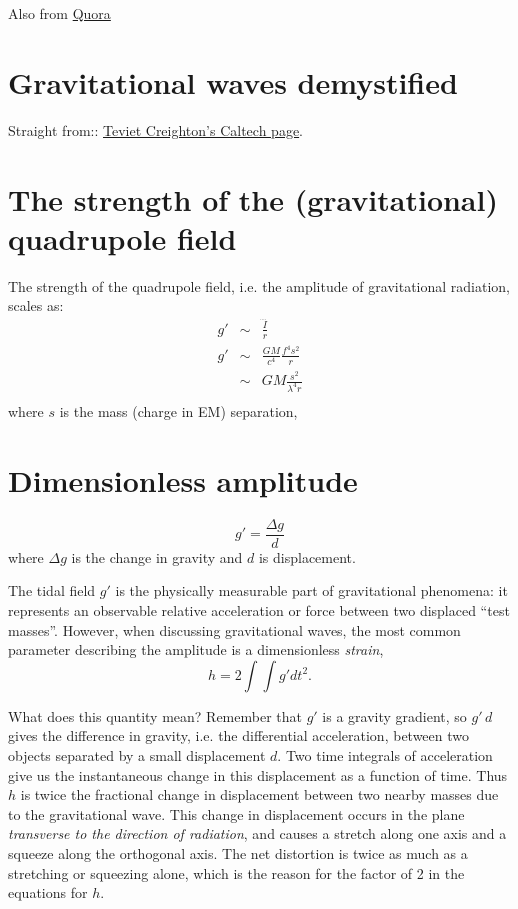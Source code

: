 \documentclass[11pt,a4paper]{article}
\begin{document}
Also from 
\href{https://www.quora.com/Why-are-gravitational-waves-transverse}{Quora} 


\section{Gravitational waves demystified}
Straight from:: 
\href{http://www.tapir.caltech.edu/~teviet/Waves/index.html}{Teviet Creighton's Caltech page}.\\

\section{The strength of the (gravitational) quadrupole field}
The strength of the quadrupole field, i.e. the amplitude of gravitational radiation, scales as:
\begin{eqnarray}
g' & \sim & \frac{\ddddot{I}}{r} \\
g' & \sim & \frac{GM}{c^4}\frac{f^4 s^2}{r} \\
    & \sim & GM \frac{s^2}{\lambda^4 r} \\
\end{eqnarray}
where $s$ is the mass (charge in EM) separation, 

\section{Dimensionless amplitude}
\begin{equation}
  g'  = \frac{\Delta g}{d}  
\end{equation}
where $\Delta g$ is the change in gravity and $d$ is displacement.

The tidal field $g'$ is the physically measurable part of
gravitational phenomena: it represents an observable relative
acceleration or force between two displaced ``test masses''. However,
when discussing gravitational waves, the most common parameter
describing the amplitude is a dimensionless {\it strain},
\begin{equation}
  h = 2 \int\int g' dt^2 .
\end{equation}

What does this quantity mean? Remember that $g'$ is a gravity
gradient, so $g' \, d$ gives the difference in gravity, i.e. the
differential acceleration, between two objects separated by a small
displacement $d$. Two time integrals of acceleration give us the
instantaneous change in this displacement as a function of time. Thus
$h$ is twice the fractional change in displacement between two nearby
masses due to the gravitational wave. This change in displacement
occurs in the plane {\it transverse to the direction of radiation},
and causes a stretch along one axis and a squeeze along the orthogonal
axis.
The net distortion is twice as much as a stretching or squeezing
alone, which is the reason for the factor of 2 in the equations for
$h$.
\end{document}
